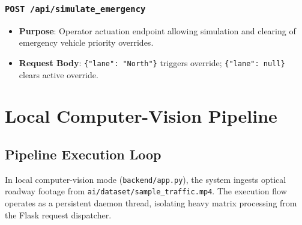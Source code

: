 \documentclass[11pt,a4paper,oneside]{report}
\begin{document}
\subsection{\texttt{POST /api/simulate\_emergency}}
\begin{itemize}[leftmargin=*]
    \item \textbf{Purpose}: Operator actuation endpoint allowing simulation and clearing of emergency vehicle priority overrides.
    \item \textbf{Request Body}: \texttt{\{"lane": "North"\}} triggers override; \texttt{\{"lane": null\}} clears active override.
\end{itemize}



\chapter{Local Computer-Vision Pipeline}

\section{Pipeline Execution Loop}
In local computer-vision mode (\texttt{backend/app.py}), the system ingests optical roadway footage from \texttt{ai/dataset/sample\_traffic.mp4}. The execution flow operates as a persistent daemon thread, isolating heavy matrix processing from the Flask request dispatcher.
\end{document}
